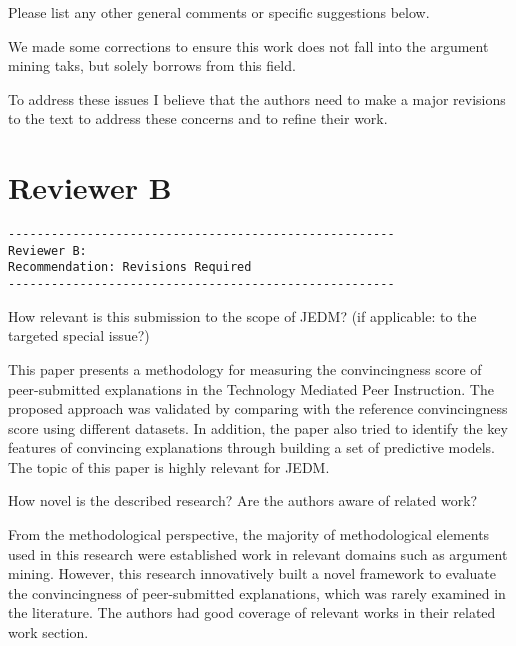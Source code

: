 \documentclass[notitlepage,12pt]{article}
\begin{document}
\begin{revcomment}{Please list any other general comments or specific suggestions below.}
    \begin{authors}
      We made some corrections to ensure this work does not fall into the argument mining taks, but solely borrows from this field.
    \end{authors}

    To address these issues I believe that the authors need to make a major revisions to the text to address these concerns and to refine their work.
    \end{revcomment}


\section{Reviewer B}

\begin{verbatim}
------------------------------------------------------
Reviewer B:
Recommendation: Revisions Required
------------------------------------------------------

\end{verbatim}

\begin{revcomment}{How relevant is this submission to the scope of JEDM? (if applicable: to the targeted special issue?)}

    This paper presents a methodology for measuring the convincingness score of peer-submitted explanations in the Technology Mediated Peer Instruction. The proposed approach was validated by comparing with the reference convincingness score using different datasets. In addition, the paper also tried to identify the key features of convincing explanations through building a set of predictive models. The topic of this paper is highly relevant for JEDM.
\end{revcomment}

    \begin{revcomment}{How novel is the described research? Are the authors aware of related work?}

    From the methodological perspective, the majority of methodological elements used in this research were established work in relevant domains such as argument mining. However, this research innovatively built a novel framework to evaluate the convincingness of peer-submitted explanations, which was rarely examined in the literature. The authors had good coverage of relevant works in their related work section.
    \end{revcomment}
\end{document}
